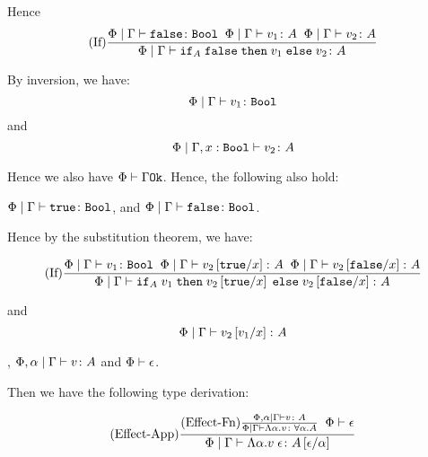 {        Hence 
        \begin{equation}
            \treerule{If}{
                \gpetyperelation{\f}{\B}
                \s\s
                \gpetyperelation{v_1}{A}
                \s\s
                \gpetyperelation{v_2}{A}
            }{
                \gpetyperelation{\pifthenelse{A}{\f}{v_1}{v_2}}{A}
            }
    \end{equation}

        By inversion, we have:
        \begin{equation}
            \gpetyperelation{v_1}{\B}
        \end{equation}
        and
        \begin{equation}
            \etyperelation{\P}{\G, x:\B}{v_2}{A}
        \end{equation}
        
        Hence we also have $\wellformedok{\P}{\G}$. Hence, the following also hold:

        $\gpetyperelation{\t}{\B}$, and $\gpetyperelation{\f}{\B}$.

        Hence by the substitution theorem, we have:

        \begin{equation}
            \treerule{If}{
                \gpetyperelation{v_1}{\B}
                \s\s
                \gpetyperelation{v_2\ssub{x}{\t}}{A}
                \s\s
                \gpetyperelation{v_2\ssub{x}{\f}}{A}
            }{\gpetyperelation{\pifthenelse{A}{v_1}{v_2\ssub{x}{\t}}{v_2\ssub{x}{\f}}}{A}
            }
        \end{equation}

        and 
        \begin{equation}
            \gpetyperelation{v_2\ssub{x}{v_1}}{A}
        \end{equation}

        \bi, $\etyperelation{\P,\a}{\G}{v}{A}$ and $\wellformed{\P}{\e}$.

        Then we have the following type derivation:

        \begin{equation}
            \treerule{Effect-App}{
                \treerule{Effect-Fn}{\etyperelation{\P,\a}{\G}{v}{A}}{\gpetyperelation{\elam{\a}{v}}{\all{\a}{A}}}
                \s\s
                \wellformed{\P}{\e}
            }{\gpetyperelation{\eapp{\elam{\a}{v}}{\e}}{A\ssub{\a}{\e}}}            
        \end{equation}

}
